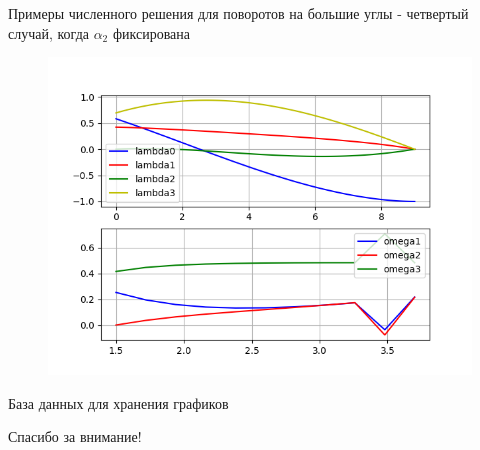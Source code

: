 \documentclass[10pt,utf8,presentation,notheorems,xcolor=dvipsnames,compress]{beamer}
\begin{document}
\begin{frame}{Примеры численного решения для поворотов на большие углы - четвертый случай, когда $\alpha_2$ фиксирована}
\begin{figure}[H]
\center\includegraphics[scale=0.5]{fig/ivp_and_control_1_5-3_7_50.png}
\caption{}
\end{figure}
\end{frame}

\begin{frame}{База данных для хранения графиков}
\end{frame}

\begin{frame}[standout]
Спасибо за внимание!
\end{frame}
\end{document}

